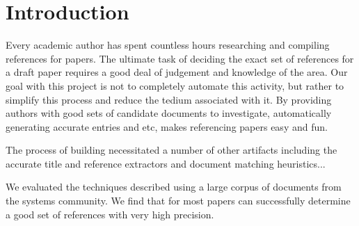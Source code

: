 \section{Introduction}
Every academic author has spent countless hours researching and compiling
references for papers.  The ultimate task of deciding the exact
set of references for a draft paper requires a good deal of judgement and
knowledge of the area.  Our goal with this project is not to completely 
automate this activity, but rather to simplify this process and reduce
the tedium associated with it.  By providing authors with good sets of 
candidate documents to investigate, automatically generating accurate 
\bibtex \cite{bibtex} entries and etc, \name makes referencing papers
easy and fun.

The process of building \name necessitated a number of other artifacts 
including the accurate title and reference extractors and document 
matching heuristics...

We evaluated the techniques described using a large corpus of \corpussize
documents from the systems community.  We find that for most papers
\name can successfully determine a good set of references with very
high precision.
